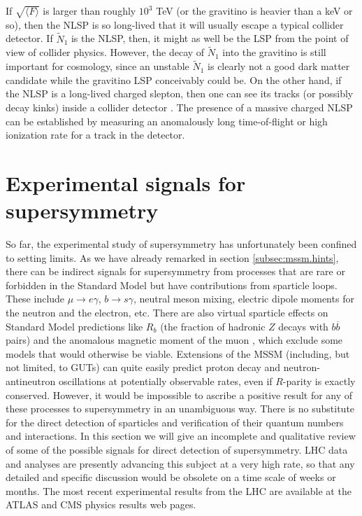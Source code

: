\documentclass[12pt]{article}
\def\stilde{\widetilde}
\def\NI{\stilde N_1}
\begin{document}
If $\sqrt{\langle F \rangle}$ is larger than roughly $10^3$ TeV (or the 
gravitino is heavier than a keV or so), then the NLSP is so long-lived 
that it will usually escape a typical collider detector. If $\NI$ is the 
NLSP, then, it might as well be the LSP from the point of view of collider 
physics. However, the decay of $\NI$ into the gravitino is still important 
for cosmology, since an unstable $\NI$ is clearly not a good dark matter 
candidate while the gravitino LSP conceivably could be. On the other hand, 
if the NLSP is a long-lived charged slepton, then one can see its tracks 
(or possibly decay kinks) inside a collider detector \cite{DDRT}. The 
presence of a massive charged NLSP can be established by measuring an 
anomalously long time-of-flight or high ionization rate for a track in the 
detector.

\section{Experimental signals for supersymmetry}\label{sec:signals}
\setcounter{equation}{0}
\setcounter{figure}{0}
\setcounter{table}{0}
\setcounter{footnote}{1}

So far, the experimental study of supersymmetry has unfortunately been 
confined to setting limits. As we have already remarked in section 
\ref{subsec:mssm.hints}, there can be indirect signals for supersymmetry 
from processes that are rare or forbidden in the Standard Model but have 
contributions from sparticle loops. These include $\mu\rightarrow 
e\gamma$, $b\rightarrow s\gamma$, neutral meson mixing, electric dipole 
moments for the neutron and the electron, etc. There are also virtual 
sparticle effects on Standard Model predictions like $R_b$ (the fraction 
of hadronic $Z$ decays with $b\overline b$ pairs) \cite{Rb} and the 
anomalous magnetic moment of the muon \cite{muonmoment}, which 
exclude some models that would otherwise be viable. 
Extensions of the MSSM (including, but not limited, to GUTs) 
can quite easily predict proton decay and neutron-antineutron 
oscillations at potentially observable rates, even if $R$-parity is exactly 
conserved. However, it would be impossible to ascribe a positive result 
for any of these processes to supersymmetry in an unambiguous way. There 
is no substitute for the direct detection of sparticles and verification 
of their quantum numbers and interactions. In this section we will give an 
incomplete and qualitative review of some of the possible signals for 
direct detection of supersymmetry. LHC data and analyses 
are presently advancing this subject at a very high rate, so that any detailed and specific discussion would be obsolete on a time scale of weeks or months. The most recent
experimental results from the LHC are available at the 
ATLAS and CMS physics results web pages.
\end{document}
